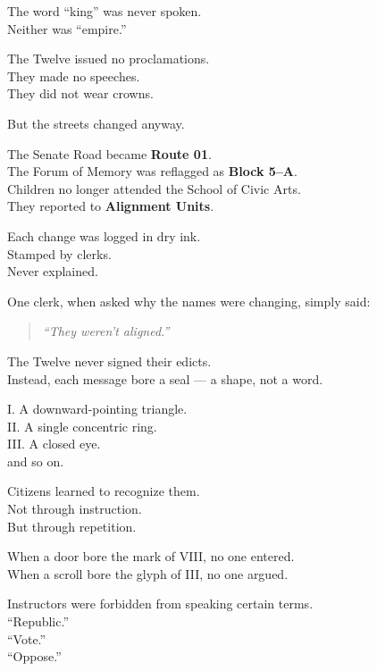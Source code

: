 \documentclass[9pt]{article}
\begin{document}
The word “king” was never spoken.\\
Neither was “empire.”

The Twelve issued no proclamations.\\
They made no speeches.\\
They did not wear crowns.

But the streets changed anyway.

\vspace{1em}

The Senate Road became \textbf{Route 01}.\\
The Forum of Memory was reflagged as \textbf{Block 5–A}.\\
Children no longer attended the School of Civic Arts.\\
They reported to \textbf{Alignment Units}.

Each change was logged in dry ink.\\
Stamped by clerks.\\
Never explained.

\vspace{1em}

One clerk, when asked why the names were changing, simply said:

\begin{quote}
\textit{“They weren’t aligned.”}
\end{quote}

\vspace{1em}

The Twelve never signed their edicts.\\
Instead, each message bore a seal — a shape, not a word.

I. A downward-pointing triangle.\\
II. A single concentric ring.\\
III. A closed eye.\\
\textellipsis{} and so on.

Citizens learned to recognize them.\\
Not through instruction.\\
But through repetition.

When a door bore the mark of VIII, no one entered.\\
When a scroll bore the glyph of III, no one argued.

\vspace{1em}

Instructors were forbidden from speaking certain terms.\\
“Republic.”\\
“Vote.”\\
“Oppose.”
\end{document}
